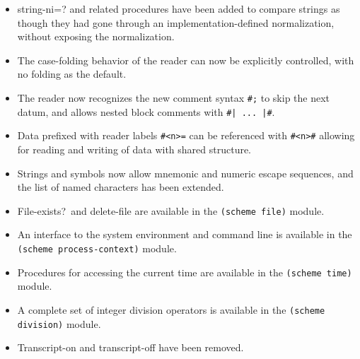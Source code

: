 \begin{itemize}
\item {\cf string-ni=?} and related procedures have been added to
compare strings as though they had gone through an
implementation-defined normalization, without exposing the
normalization.

\item The case-folding behavior of the reader can now be explicitly
controlled, with no folding as the default.

\item The reader now recognizes the new comment syntax {\tt \#;} to
skip the next datum, and allows nested block comments with
{\tt \#| ... |\#}.

\item Data prefixed with reader labels {\tt \#<n>=} can be referenced
with {\tt \#<n>\#} allowing for reading and writing of data with
shared structure.

\item Strings and symbols now allow mnemonic and numeric escape
sequences, and the list of named characters has been extended.

\item {\cf File-exists?}\ and {\cf delete-file} are available in the
{\tt (scheme file)} module.

\item An interface to the system environment and command line is
available in the {\tt (scheme process-context)} module.

\item Procedures for accessing the current time are available in the
{\tt (scheme time)} module.

\item A complete set of integer division operators is available in the
{\tt (scheme division)} module.

\item {\cf Transcript-on} and {\cf transcript-off} have been removed.

\end{itemize}




